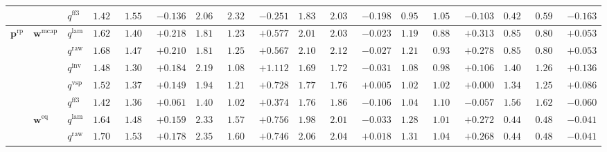 \documentclass[eng]{kjas3}
\begin{document}
\begin{table}[t]
{\begin{tabular}{lll ccc ccc ccc ccc ccc}
 &  & $q^{\mathrm{ff3}}$ & $1.420$ & $1.557$ & \cellcolor{negred!50}$-0.136$ & $2.069$ & $2.320$ & \cellcolor{negred!50}$-0.251$ & $1.835$ & $2.033$ & \cellcolor{negred!50}$-0.198$ & $0.951$ & $1.054$ & \cellcolor{negred!50}$-0.103$ & $0.427$ & $0.590$ & \cellcolor{negred!50}$-0.163$ \\
\midrule
$\mathbf{p}^{\mathrm{rp}}$ & $\mathbf{w}^{\mathrm{mcap}}$ & $q^{\mathrm{lam}}$ & $1.625$ & $1.407$ & \cellcolor{posgreen!50}$+0.218$ & $1.814$ & $1.237$ & \cellcolor{posgreen!50}$+0.577$ & $2.010$ & $2.034$ & \cellcolor{negred!50}$-0.023$ & $1.196$ & $0.883$ & \cellcolor{posgreen!50}$+0.313$ & $0.855$ & $0.802$ & \cellcolor{posgreen!50}$+0.053$ \\
 &  & $q^{\mathrm{raw}}$ & $1.683$ & $1.473$ & \cellcolor{posgreen!50}$+0.210$ & $1.817$ & $1.250$ & \cellcolor{posgreen!50}$+0.567$ & $2.101$ & $2.129$ & \cellcolor{negred!50}$-0.027$ & $1.213$ & $0.935$ & \cellcolor{posgreen!50}$+0.278$ & $0.855$ & $0.802$ & \cellcolor{posgreen!50}$+0.053$ \\
 &  & $q^{\mathrm{inv}}$ & $1.489$ & $1.305$ & \cellcolor{posgreen!50}$+0.184$ & $2.194$ & $1.083$ & \cellcolor{posgreen!50}$+1.112$ & $1.692$ & $1.724$ & \cellcolor{negred!50}$-0.031$ & $1.087$ & $0.981$ & \cellcolor{posgreen!50}$+0.106$ & $1.402$ & $1.266$ & \cellcolor{posgreen!50}$+0.136$ \\
 &  & $q^{\mathrm{vsp}}$ & $1.520$ & $1.371$ & \cellcolor{posgreen!50}$+0.149$ & $1.943$ & $1.215$ & \cellcolor{posgreen!50}$+0.728$ & $1.770$ & $1.765$ & \cellcolor{posgreen!50}$+0.005$ & $1.021$ & $1.021$ & $+0.000$ & $1.342$ & $1.256$ & \cellcolor{posgreen!50}$+0.086$ \\
 &  & $q^{\mathrm{ff3}}$ & $1.421$ & $1.360$ & \cellcolor{posgreen!50}$+0.061$ & $1.400$ & $1.026$ & \cellcolor{posgreen!50}$+0.374$ & $1.763$ & $1.869$ & \cellcolor{negred!50}$-0.106$ & $1.043$ & $1.100$ & \cellcolor{negred!50}$-0.057$ & $1.568$ & $1.627$ & \cellcolor{negred!50}$-0.060$ \\
\cmidrule(lr){2-18}
 & $\mathbf{w}^{\mathrm{eq}}$ & $q^{\mathrm{lam}}$ & $1.647$ & $1.488$ & \cellcolor{posgreen!50}$+0.159$ & $2.335$ & $1.578$ & \cellcolor{posgreen!50}$+0.756$ & $1.985$ & $2.018$ & \cellcolor{negred!50}$-0.033$ & $1.287$ & $1.015$ & \cellcolor{posgreen!50}$+0.272$ & $0.443$ & $0.484$ & \cellcolor{negred!50}$-0.041$ \\
 &  & $q^{\mathrm{raw}}$ & $1.708$ & $1.530$ & \cellcolor{posgreen!50}$+0.178$ & $2.350$ & $1.605$ & \cellcolor{posgreen!50}$+0.746$ & $2.065$ & $2.047$ & \cellcolor{posgreen!50}$+0.018$ & $1.312$ & $1.045$ & \cellcolor{posgreen!50}$+0.268$ & $0.443$ & $0.484$ & \cellcolor{negred!50}$-0.041$ \\

\end{tabular}}
\end{table}
\end{document}
